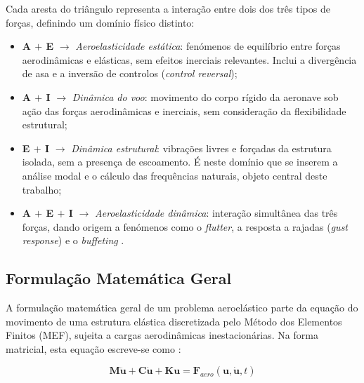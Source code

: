 \documentclass[11pt,twoside,a4paper]{report}
\begin{document}
Cada aresta do triângulo representa a interação entre dois dos três tipos de forças, definindo um domínio físico distinto:

\begin{itemize}
    \item \textbf{A $+$ E} $\rightarrow$ \textit{Aeroelasticidade estática}: fenómenos de equilíbrio entre forças aerodinâmicas e elásticas, sem efeitos inerciais relevantes. Inclui a divergência de asa e a inversão de controlos (\textit{control reversal});

    \item \textbf{A $+$ I} $\rightarrow$ \textit{Dinâmica do voo}: movimento do corpo rígido da aeronave sob ação das forças aerodinâmicas e inerciais, sem consideração da flexibilidade estrutural;

    \item \textbf{E $+$ I} $\rightarrow$ \textit{Dinâmica estrutural}: vibrações livres e forçadas da estrutura isolada, sem a presença de escoamento. É neste domínio que se inserem a análise modal e o cálculo das frequências naturais, objeto central deste trabalho;

    \item \textbf{A $+$ E $+$ I} $\rightarrow$ \textit{Aeroelasticidade dinâmica}: interação simultânea das três forças, dando origem a fenómenos como o \textit{flutter}, a resposta a rajadas (\textit{gust response}) e o \textit{buffeting} \cite{Dowell2004, Wright2015}.
\end{itemize}

\subsection{Formulação Matemática Geral}

A formulação matemática geral de um problema aeroelástico parte da equação do movimento de uma estrutura elástica discretizada pelo Método dos Elementos Finitos (MEF), sujeita a cargas aerodinâmicas inestacionárias. Na forma matricial, esta equação escreve-se como \cite{Hodges2011, Nastran2014}:

\begin{equation}
    \mathbf{M}\ddot{\mathbf{u}} + \mathbf{C}\dot{\mathbf{u}} + 
    \mathbf{K}\mathbf{u} = \mathbf{F}_{aero}(\mathbf{u}, 
    \dot{\mathbf{u}}, t)
    \label{eq:eom_geral}
\end{equation}
\end{document}
